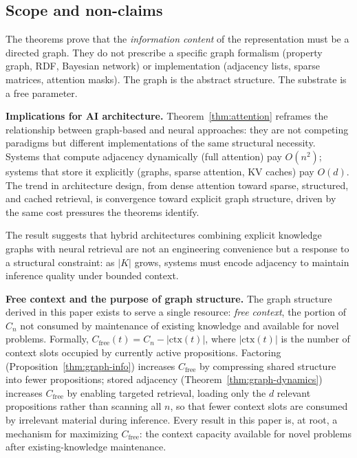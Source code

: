 \documentclass[11pt]{article}
\theoremstyle{definition}
\begin{document}
\subsection{Scope and non-claims}

The theorems prove that the \emph{information content} of the
representation must be a directed graph. They do not prescribe a
specific graph formalism (property graph, RDF, Bayesian network) or
implementation (adjacency lists, sparse matrices, attention masks). The
graph is the abstract structure. The substrate is a free parameter.

\textbf{Implications for AI architecture.}
Theorem~\ref{thm:attention} reframes the relationship between
graph-based and neural approaches: they are not competing paradigms but
different implementations of the same structural necessity. Systems that
compute adjacency dynamically (full attention) pay $O(n^2)$; systems
that store it explicitly (graphs, sparse attention, KV caches) pay
$O(d)$. The trend in architecture design, from dense attention toward
sparse, structured, and cached retrieval, is convergence toward
explicit graph structure, driven by the same cost pressures the theorems
identify.

The result suggests that hybrid architectures combining explicit
knowledge graphs with neural retrieval are not an engineering
convenience but a response to a structural constraint: as $|K|$ grows,
systems must encode adjacency to maintain inference quality under bounded
context.

\textbf{Free context and the purpose of graph structure.}
The graph structure derived in this paper exists to serve a single
resource: \emph{free context}, the portion of $C_n$ not consumed by
maintenance of existing knowledge and available for novel problems.
Formally, $C_{\mathrm{free}}(t) = C_n - |\mathrm{ctx}(t)|$,
where $|\mathrm{ctx}(t)|$ is the number of context slots occupied by
currently active propositions. Factoring
(Proposition~\ref{thm:graph-info}) increases $C_{\mathrm{free}}$ by
compressing shared structure into fewer propositions; stored adjacency
(Theorem~\ref{thm:graph-dynamics}) increases $C_{\mathrm{free}}$ by
enabling targeted retrieval, loading only the $d$ relevant propositions
rather than scanning all $n$, so that fewer context slots are consumed
by irrelevant material during inference. Every result in this paper is, at root,
a mechanism for maximizing $C_{\mathrm{free}}$: the context capacity
available for novel problems after existing-knowledge maintenance.
\end{document}
